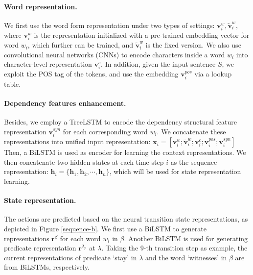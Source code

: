 \documentclass[letterpaper]{article} \usepackage{aaai21}  \usepackage{times}  \usepackage{helvet} \usepackage{courier}  \usepackage[hyphens]{url}  \usepackage{graphicx} \urlstyle{rm} \def\UrlFont{\rm}  \usepackage{natbib}  \usepackage{caption}
\begin{document}
\begin{CJK}{UTF8}{gbsn}
\paragraph{Word representation.}
We first use the word form representation under two types of settings: $\bm{v}^w_i,\tilde{\bm{v}}^w_i $,
where $\bm{v}^w_i$ is the representation initialized with a pre-trained embedding vector for word $w_i$, which further can be trained, and $\tilde{\bm{v}}^w_i$ is the fixed version.
We also use convolutional neural networks (CNNs) to encode characters inside a word $w_i$ into character-level representation $\bm{v}^{c}_i$.
In addition, given the input sentence $S$, we exploit the POS tag of the tokens, and use the embedding $\bm{v}^{pos}_i$ via a lookup table.


\paragraph{Dependency features enhancement.}
Besides, we employ a TreeLSTM \cite{tai-etal-2015-improved,miwa-bansal-2016-end} to encode the dependency structural feature representation $\bm{v}^{syn}_i$ for each corresponding word $w_i$.
We concatenate these representations into unified input representation: $\bm{x}_i = [\bm{v}^w_i ; \tilde{\bm{v}}^w_i;\bm{v}^{c}_i;\bm{v}^{pos}_i;\bm{v}^{syn}_i ]$
Then, a BiLSTM is used as encoder for learning the context representations.
We then concatenate two hidden states at each time step $i$ as the sequence representation: $\bm{h}_{i}= \{\bm{h}_{1}, \bm{h}_{2}, \cdots , \bm{h}_{n} \}$, which will be used for state representation learning.





\paragraph{State representation.}


The actions are predicted based on the neural transition state representations, as depicted in Figure \ref{sequence-b}.
We first use a BiLSTM to generate  representations $\bm{r}^{\beta}$ for each word $w_i$ in $\beta$.
Another BiLSTM is used for generating predicate representation $\bm{r}^{\lambda_p}$ at $\lambda$.
Taking the $9$-th transition step as example, the current representations of predicate `stay' in $\lambda$ and the word `witnesses' in $\beta$ are from BiLSTMs, respectively.



\end{CJK}
\end{document}
